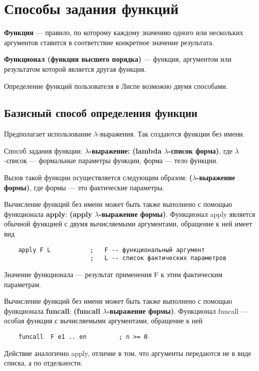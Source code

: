 \section{Способы задания функций}

\textbf{Функция} --- правило, по которому каждому значению одного или нескольких аргументов ставится в соответствие конкретное значение результата.

\textbf{Функционал (функция высшего порядка)} --- функция, аргументом или результатом которой является другая функция.

Определение функций пользователя в Лиспе возможно двумя способами.

\subsection{Базисный способ определения функции}

Предполагает использование $\lambda$-выражения. Так создаются функции без имени. 

Способ задания функции: \textbf{$\lambda$-выражение: (lambda $\lambda$-список форма)}, где $\lambda$-список --- формальные параметры функции, форма --- тело функции. 

Вызов такой функции осуществляется следующим образом: \textbf{($\lambda$-выражение формы)}, где формы --- это фактические параметры. 

Вычисление функций без имени может быть также выполнено с помощью функционала \textbf{apply}: \textbf{(apply $\lambda$-выражение формы)}. 
Функционал apply является обычной функцией с двумя вычисляемыми аргументами, обращение к ней имеет вид 
\begin{lstlisting}
    apply F L           ;   F -- функциональный аргумент 
                        ;   L -- список фактических параметров
\end{lstlisting}

Значение функционала --- результат применения F к этим фактическим параметрам.

Вычисление функций без имени может быть также выполнено с помощью функционала \textbf{funcall}: \textbf{(funcall $\lambda$-выражение формы)}. Функционал funcall --- особая функция с вычисляемыми аргументами, обращение к ней
\begin{lstlisting}
    funcall  F e1 .. en         ; n >= 0
\end{lstlisting}

Действие аналогично apply, отличие в том, что аргументы передаются не в виде списка, а по отдельности.

